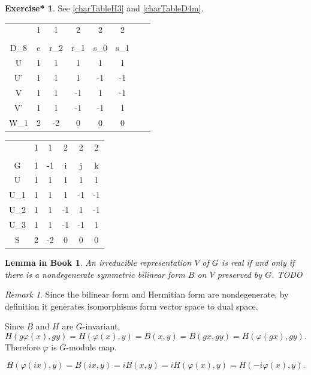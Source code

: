 \documentclass[12pt, letterpaper]{article}
\newcommand{\red}[1]{{\color{red} #1}}
\theoremstyle{definition}
\theoremstyle{remark}
\newtheorem*{rem*}{Remark}
\theoremstyle{definition}
\newtheorem{exe*}[exe]{Exercise*}
\theoremstyle{plain}
\newtheorem{llem}[exe]{Lemma in Book}
\numberwithin{equation}{section}
\begin{document}
	\begin{exe*}
		See \ref{charTableH3} and \ref{charTableD4m}.
		
		
		\begin{center}
			\begin{tabular}{C | C C C C C C C}
				&1&1&2&2&2\\
				\\
				D_{8}&e&r_2&r_1&s_0&s_1\\
				\hline
				U&1&1&1&1&1\\
				U'&1&1&1&-1&-1\\
				V&1&1&-1&1&-1\\
				V'&1&1&-1&-1&1\\
				W_1&2&-2&0&0&0\\
			\end{tabular}
		\end{center}
	
		\begin{center}
			\begin{tabular}{C | C C C C C }
				& 1 & 1 & 2 & 2 & 2 \\
				\\
				G& 1 & -1 & \pm i  & \pm j &  \pm k \\
				\hline
				U & 1 & 1 & 1 & 1 & 1 \\
				U_1 & 1 & 1 & 1 &-1&-1\\
				U_2 & 1 & 1 & -1&1&-1\\
				U_3 & 1 & 1 & -1&-1&1\\
				S & 2 & -2 & 0 & 0&0\\ 
			\end{tabular}
		\end{center}
	\end{exe*}

	\begin{llem}
		An irreducible representation $V$ of $G$ is real if and only if there is 
		a nondegenerate symmetric bilinear form $B$ on $V$ preserved by $G$. \red{TODO}
	\end{llem}
	\begin{rem*}
		Since the bilinear form and Hermitian form are nondegenerate,
		by definition it generates isomorphisms form vector space to dual space.
		
		Since $B$ and $H$ are $G$-invariant,
		\[H(g\varphi(x),gy)= H(\varphi(x),y)=B(x,y)=B(gx,gy)=H(\varphi(gx),gy).\]
		Therefore $\varphi$ is $G$-module map.
		
		\[H(\varphi(ix),y)=B(ix,y)=iB(x,y)=iH(\varphi(x),y)= H(-i\varphi(x),y).\]
	\end{rem*}
\end{document}
